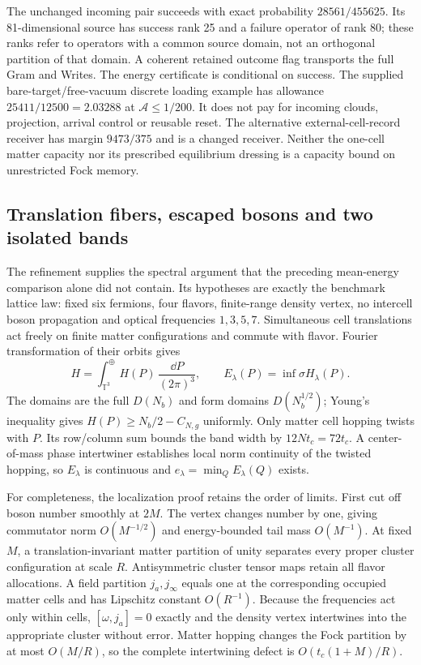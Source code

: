 The unchanged incoming pair succeeds with exact probability
$28561/455625$. Its 81-dimensional source has success rank 25 and a
failure operator of rank 80; these ranks refer to operators with a common
source domain, not an orthogonal partition of that domain. A coherent
retained outcome flag transports the full Gram and Writes. The energy
certificate is conditional on success. The supplied bare-target/free-vacuum
discrete loading example has allowance $25411/12500=2.03288$ at
$\mathcal A\le1/200$. It does not pay for incoming clouds, projection,
arrival control or reusable reset. The alternative external-cell-record
receiver has margin $9473/375$ and is a changed receiver. Neither the
one-cell matter capacity nor its prescribed equilibrium dressing is a
capacity bound on unrestricted Fock memory.

\subsection{Translation fibers, escaped bosons and two isolated bands}
\label{sec:fiber-12}

The refinement supplies the spectral argument that the preceding
mean-energy comparison alone did not contain. Its hypotheses are exactly
the benchmark lattice law: fixed six fermions, four flavors, finite-range
density vertex, no intercell boson propagation and optical frequencies
$1,3,5,7$. Simultaneous cell translations act freely on finite matter
configurations and commute with flavor. Fourier transformation of their
orbits gives
\begin{equation}
 H=\int_{\mathbb T^3}^{\oplus}H(P)\,\frac{\dd P}{(2\pi)^3},
 \qquad E_\lambda(P)=\inf\sigma H_\lambda(P).
\end{equation}
The domains are the full $D(N_b)$ and form domains $D(N_b^{1/2})$;
Young's inequality gives $H(P)\ge N_b/2-C_{N,g}$ uniformly. Only matter
cell hopping twists with $P$. Its row/column sum bounds the band width by
$12Nt_c=72t_c$. A center-of-mass phase intertwiner establishes local
norm continuity of the twisted hopping, so $E_\lambda$ is continuous and
$e_\lambda=\min_QE_\lambda(Q)$ exists.

For completeness, the localization proof retains the order of limits.
First cut off boson number smoothly at $2M$. The vertex changes number by
one, giving commutator norm $O(M^{-1/2})$ and energy-bounded tail mass
$O(M^{-1})$. At fixed $M$, a translation-invariant matter partition of
unity separates every proper cluster configuration at scale $R$.
Antisymmetric cluster tensor maps retain all flavor allocations. A field
partition $j_a,j_\infty$ equals one at the corresponding occupied matter
cells and has Lipschitz constant $O(R^{-1})$. Because the frequencies act
only within cells, $[\omega,j_a]=0$ exactly and the density vertex
intertwines into the appropriate cluster without error. Matter hopping
changes the Fock partition by at most $O(M/R)$, so the complete
intertwining defect is $O(t_c(1+M)/R)$.

